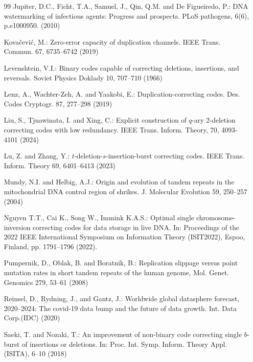 \documentclass[pdflatex,sn-mathphys-num]{sn-jnl}
\theoremstyle{theorem}%
\theoremstyle{definition}
\theoremstyle{construction}
\newtheorem{open problem}{Open problem}
\begin{document}
\begin{thebibliography}{99}
		Jupiter, D.C., Ficht, T.A., Samuel, J., Qin, Q.M. and De Figueiredo, P.: DNA watermarking of infectious agents: Progress and prospects. PLoS pathogens, 6(6), p.e1000950. (2010)
		
		Kovačevi\'c, M.: 
		Zero-error capacity of duplication channels. 
		IEEE Trans. Commun. 67, 6735–6742 (2019)
		
		Levenshtein, V.I.: 
		Binary codes capable of correcting deletions, insertions, and reversals. 
		Soviet Physics Doklady 10, 707–710 (1966)
		
		Lenz, A., Wachter-Zeh, A. and Yaakobi, E.: 
		Duplication-correcting codes. 
		Des. Codes Cryptogr. 87, 277–298 (2019)
		
		Liu, S., Tjuawinata, I. and Xing, C.: Explicit construction of $q$-ary 2-deletion correcting codes with low redundancy. IEEE Trans. Inform. Theory, 70, 4093-4101 (2024)
		
		Lu, Z. and Zhang, Y.: 
		$t$-deletion-$s$-insertion-burst correcting codes. 
		IEEE Trans. Inform. Theory 69, 6401–6413 (2023)
		
		Mundy, N.I. and Helbig, A.J.: 
		Origin and evolution of tandem repeats in the mitochondrial DNA control region of shrikes. 
		J. Molecular Evolution 59, 250–257 (2004)

 Nguyen T.T., Cai K., Song W., Immink K.A.S.: Optimal single chromosome-inversion correcting codes for data storage in live DNA. In: Proceedings of the 2022 IEEE International Symposium on Information Theory (ISIT2022), Espoo, Finland, pp. 1791–1796 (2022).
		
       Pumpernik, D.,  Oblak, B. and Boratnik, B.: Replication slippage versus point mutation rates in short tandem repeats of the human genome, Mol. Genet. Genomics 279, 53–61 (2008)
		
		Reinsel, D., Rydning, J., and Gantz, J.: Worldwide global datasphere
		forecast, 2020–2024: The covid-19 data bump and the future of data
		growth. Int. Data Corp.(IDC) (2020)
		
		
    	Saeki, T. and Nozaki, T.:
	  An improvement of non-binary code correcting single $b$-burst of insertions or deletions. 
	  In: Proc. Int. Symp. Inform. Theory Appl. (ISITA), 6–10 (2018)
	

\end{thebibliography}
\end{document}
